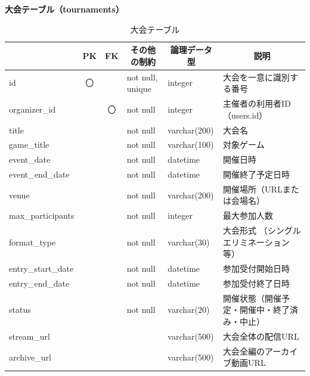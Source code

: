 \noindent\textbf{大会テーブル（tournaments）}
\begin{table}[H]
    \centering
    \caption{大会テーブル}
    \label{tab:tournaments_table}
    \begin{tabularx}{\linewidth}{|l|c|c|l|l|X|}
        \hline
        \rowcolor{tableblue}
        \multicolumn{1}{|c|}{カラム名} & \multicolumn{1}{c|}{PK} & \multicolumn{1}{c|}{FK} & \multicolumn{1}{c|}{その他の制約} & \multicolumn{1}{c|}{論理データ型} & \multicolumn{1}{c|}{説明} \\ \hline
        id & 〇 & & not null, unique & integer & 大会を一意に識別する番号 \\ \hline
        organizer\_id & & 〇 & not null & integer & 主催者の利用者ID（users.id） \\ \hline
        title & & & not null & varchar(200) & 大会名 \\ \hline
        game\_title & & & not null & varchar(100) & 対象ゲーム \\ \hline
        event\_date & & & not null & datetime & 開催日時 \\ \hline
        event\_end\_date & & & not null & datetime & 開催終了予定日時 \\ \hline
        venue & & & not null & varchar(200) & 開催場所（URLまたは会場名） \\ \hline
        max\_participants & & & not null & integer & 最大参加人数 \\ \hline
        format\_type & & & not null & varchar(30) & 大会形式 \newline（シングルエリミネーション等） \\ \hline
        entry\_start\_date & & & not null & datetime & 参加受付開始日時 \\ \hline
        entry\_end\_date & & & not null & datetime & 参加受付終了日時 \\ \hline
        status & & & not null & varchar(20) & 開催状態（開催予定・開催中・終了済み・中止） \\ \hline
        stream\_url & & & & varchar(500) & 大会全体の配信URL \\ \hline
        archive\_url & & & & varchar(500) & 大会全編のアーカイブ動画URL \\ \hline
    \end{tabularx}
\end{table}

